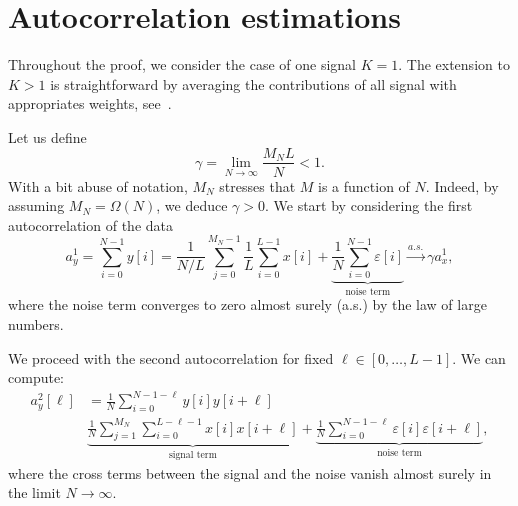 \documentclass[english,11pt]{article}
\numberwithin{equation}{section}
\theoremstyle{plain}
\theoremstyle{definition}
\theoremstyle{remark}
\theoremstyle{plain}
\theoremstyle{remark}
\theoremstyle{plain}
\theoremstyle{plain}
\begin{document}
\appendix

\section{Autocorrelation estimations} \label{sec:autocorrelation_computation}

Throughout the proof, we consider the case of one signal $K=1$. The extension to $K>1$ is straightforward by averaging the contributions of all signal with  appropriates weights, see~\cite{boumal2017heterogeneous}. 

Let us define
\begin{equation}
\gamma = \lim_{N\to\infty} \frac{M_NL}{N}<1.
\end{equation}
With a bit abuse of notation, $M_N$ stresses that $M$ is a function of $N$. Indeed, by assuming $M_N=\Omega(N)$, we deduce $\gamma>0$.
We start by considering the first autocorrelation of the data
\begin{equation}
a_y^1 = \sum_{i=0}^{N-1} y[i] = \frac{1}{N/L}\sum_{j=0}^{M_N-1}\frac{1}{L}\sum_{i=0}^{L-1}x[i] + \underbrace{\frac{1}{N}\sum_{i=0}^{N-1}\varepsilon[i]}_{\text{noise term}} \xrightarrow{a.s.}\gamma a_x^1,
\end{equation}
where the noise term converges to zero almost surely (a.s.) by the law of large numbers.

We proceed with the second autocorrelation for fixed $\ell\in[0,\ldots,L-1]$. We can compute:
\begin{equation}
\begin{split}
a_y^2[\ell] & = \frac{1}{N}\sum_{i=0}^{N-1-\ell}y[i]y[i+\ell] \\
& \underbrace{\frac{1}{N}\sum_{j=1}^{M_N}\sum_{i=0}^{L-\ell-1}x[i]x[i+\ell]}_{\text{signal term}} + \underbrace{\frac{1}{N}\sum_{i=0}^{N-1-\ell}\varepsilon[i]\varepsilon[i+\ell]}_{\text{noise term}},
\end{split}
\end{equation}
where the cross terms between the signal and the noise vanish  almost surely in the limit $N\to\infty$. 
\end{document}
